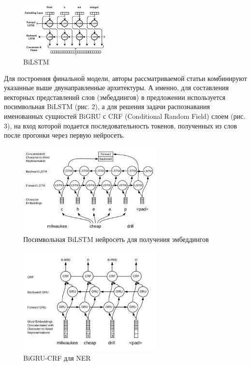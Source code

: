 \documentclass[12pt,a4paper]{article}
\begin{document}
\begin{figure}[H]
\begin{center}
  \includegraphics[width=0.4\textwidth]{bilstm.png}
  \caption{BiLSTM}
\end{center}
\end{figure}

Для построения финальной модели, авторы рассматриваемой статьи комбинируют указанные выше двунаправленные архитектуры. А именно, для составления векторных представлений слов (эмбеддингов) в предложении используется посимвольная BiLSTM (рис. 2), а для решения задачи распознавания именованных сущностей BiGRU с CRF\cite{crf} (Conditional Random Field) слоем (рис. 3), на вход которой подается последовательность токенов, полученных из слов после прогонки через первую нейросеть.

\begin{figure}[H]
\begin{center}
  \includegraphics[width=0.65\textwidth]{pap_emb.jpg}
  \caption{Посимвольная BiLSTM нейросеть для получения эмбеддингов}
\end{center}
\end{figure}

\begin{figure}[H]
\begin{center}
  \includegraphics[width=0.65\textwidth]{pap_net.jpg}
  \caption{BiGRU-CRF для NER}
\end{center}
\end{figure}
\end{document}
